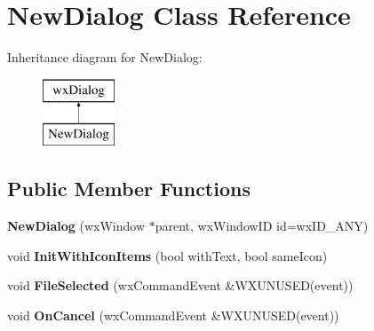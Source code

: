 \hypertarget{class_new_dialog}{\section{New\+Dialog Class Reference}
\label{class_new_dialog}
}
Inheritance diagram for New\+Dialog\+:\begin{figure}[H]
\begin{center}
\leavevmode
\includegraphics[height=2.000000cm]{class_new_dialog}
\end{center}
\end{figure}
\subsection*{Public Member Functions}
\begin{DoxyCompactItemize}
\item 
\hypertarget{class_new_dialog_a6910ade228aac35f03cb8840d12b79f7}{{\bfseries New\+Dialog} (wx\+Window $\ast$parent, wx\+Window\+I\+D id=wx\+I\+D\+\_\+\+A\+N\+Y)}\label{class_new_dialog_a6910ade228aac35f03cb8840d12b79f7}

\item 
\hypertarget{class_new_dialog_a0ff3a246f99184deffc5d89589725b73}{void {\bfseries Init\+With\+Icon\+Items} (bool with\+Text, bool same\+Icon)}\label{class_new_dialog_a0ff3a246f99184deffc5d89589725b73}

\item 
\hypertarget{class_new_dialog_aaff9ed71f3680ab6017d7189da769e63}{void {\bfseries File\+Selected} (wx\+Command\+Event \&W\+X\+U\+N\+U\+S\+E\+D(event))}\label{class_new_dialog_aaff9ed71f3680ab6017d7189da769e63}

\item 
\hypertarget{class_new_dialog_a235c2e6d2a3b472bfd00c29384e199e3}{void {\bfseries On\+Cancel} (wx\+Command\+Event \&W\+X\+U\+N\+U\+S\+E\+D(event))}\label{class_new_dialog_a235c2e6d2a3b472bfd00c29384e199e3}

\end{DoxyCompactItemize}
